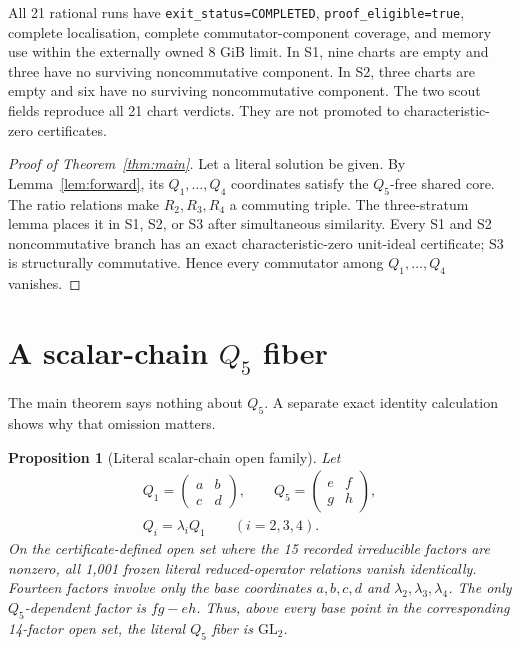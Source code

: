 \documentclass[11pt]{article}
\newtheorem{proposition}{Proposition}
\theoremstyle{remark}
\theoremstyle{plain}
\newcommand{\GL}{\mathrm{GL}}
\newcommand{\artifact}[1]{\texttt{\small #1}}
\begin{document}
All 21 rational runs have
\artifact{exit\_status=COMPLETED},
\artifact{proof\_eligible=true}, complete localisation, complete
commutator-component coverage, and memory use within the externally owned
8 GiB limit.  In S1, nine charts are empty and three have no surviving
noncommutative component.  In S2, three charts are empty and six have no
surviving noncommutative component.  The two scout fields reproduce all
21 chart verdicts.  They are not promoted to characteristic-zero
certificates.

\begin{proof}[Proof of Theorem~\ref{thm:main}]
Let a literal solution be given.  By Lemma~\ref{lem:forward}, its
\(Q_1,\ldots,Q_4\) coordinates satisfy the \(Q_5\)-free shared core.
The ratio relations make \(R_2,R_3,R_4\) a commuting triple.  The
three-stratum lemma places it in S1, S2, or S3 after simultaneous
similarity.  Every S1 and S2 noncommutative branch has an exact
characteristic-zero unit-ideal certificate; S3 is structurally
commutative.  Hence every commutator among \(Q_1,\ldots,Q_4\) vanishes.
\end{proof}

\section{A scalar-chain \texorpdfstring{\(Q_5\)}{Q5} fiber}

The main theorem says nothing about \(Q_5\).  A separate exact identity
calculation shows why that omission matters.

\begin{proposition}[Literal scalar-chain open family]
\label{prop:fiber}
Let
\[
\begin{gathered}
 Q_1=\begin{pmatrix}a&b\\c&d\end{pmatrix},\qquad
 Q_5=\begin{pmatrix}e&f\\g&h\end{pmatrix},\\
 Q_i=\lambda_iQ_1\qquad(i=2,3,4).
\end{gathered}
\]
On the certificate-defined open set where the 15 recorded irreducible
factors are nonzero, all 1,001 frozen literal reduced-operator relations
vanish identically.  Fourteen factors involve only the base coordinates
\(a,b,c,d\) and \(\lambda_2,\lambda_3,\lambda_4\).  The only
\(Q_5\)-dependent factor is \(fg-eh\).  Thus, above every base point in
the corresponding 14-factor open set, the literal \(Q_5\) fiber is
\(\GL_2\).
\end{proposition}
\end{document}

